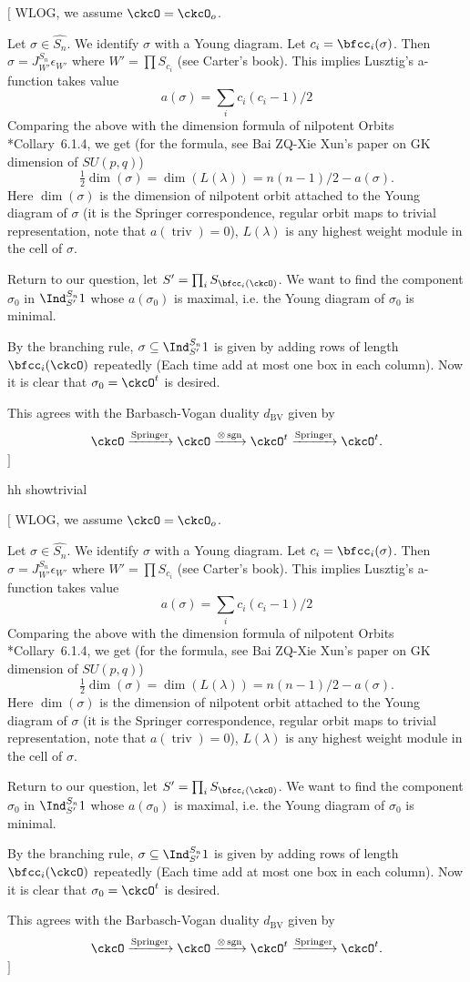 \documentclass[12pt,a4paper]{amsart}
\newcommand{\trivial}[2][]{\if\relax\detokenize{#1}\relax
  {%
      \color{orange} \vspace{0em} $[$  #2 $]$
      \color{black}
  }
  \else
\ifx#1h
\ifcsname showtrivial\endcsname
{%
    \color{orange} \vspace{0em}  $[$ #2 $]$
    \color{black}
}
\fi
\else {\red Wrong argument!} \fi
\fi
}
\def\subset{\subseteq}
\def\abs#1{\left|{#1}\right|}
\newcommand{\sgn}{\operatorname{sgn}}
\newcommand{\triv}{\operatorname{triv}}
\numberwithin{equation}{section}
\theoremstyle{remark}
\def\half{{\tfrac{1}{2}}}
\def\dBV{d_{\mathrm{BV}}}
\def\lamck{\lambda_\ckcO}
\def\Wint#1{W_{[#1]}}
\def\Spr{\mathrm{Springer}}
\begin{document}
\trivial[h]{ WLOG, we assume $\ckcO = \ckcO_o$.

  Let $\sigma\in \widehat{S_n}$. We identify $\sigma$ with a Young diagram. Let
  $c_i = \bfcc_i(\sigma)$. Then $\sigma = J^{S_n}_{W'} \epsilon_{W'}$ where
  $W' = \prod S_{c_i}$ (see Carter's book). This implies Lusztig's a-function
  takes value
  \[
    a(\sigma) = \sum_i c_i(c_i-1) /2
  \]
  Comparing the above with the dimension formula of nilpotent Orbits
  \cite{CM}*{Collary~6.1.4}, we get (for the formula, see Bai ZQ-Xie Xun's paper
  on GK dimension of $SU(p,q)$)
  \[
    \half \dim(\sigma) = \dim(L(\lambda)) = n(n-1)/2 - a(\sigma).
  \]
  Here $\dim(\sigma)$ is the dimension of nilpotent orbit attached to the Young
  diagram of $\sigma$ (it is the Springer correspondence, regular orbit maps to
  trivial representation, note that $a(\triv)=0$), $L(\lambda)$ is any highest
  weight module in the cell of $\sigma$.


  Return to our question, let $S' = \prod_i S_{\bfcc_i(\ckcO)}$. We want to find
  the component $\sigma_0$ in $\Ind_{S'}^{S_n} 1$ whose $a(\sigma_0)$ is
  maximal, i.e. the Young diagram of $\sigma_0$ is minimal.

  By the branching rule, $\sigma \subset \Ind_{S'}^{S_n} 1$ is given by adding
  rows of length $\bfcc_i(\ckcO)$ repeatedly (Each time add at most one box in
  each column). Now it is clear that $\sigma_0 = \ckcO^t$ is desired.

  This agrees with the Barbasch-Vogan duality $\dBV$ given by
  \[
    \ckcO \xrightarrow{\Spr}\ckcO \xrightarrow{\otimes \sgn} \ckcO^t \xrightarrow{\Spr} \ckcO^t.
  \]
}
\end{document}
